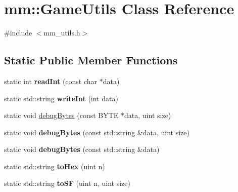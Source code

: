 \hypertarget{classmm_1_1_game_utils}{}\section{mm\+:\+:Game\+Utils Class Reference}
\label{classmm_1_1_game_utils}


{\ttfamily \#include $<$mm\+\_\+utils.\+h$>$}

\subsection*{Static Public Member Functions}
\begin{DoxyCompactItemize}
\item 
\hypertarget{classmm_1_1_game_utils_a4118fb069fcca220219a341ef0ebc362}{}static int {\bfseries read\+Int} (const char $\ast$data)\label{classmm_1_1_game_utils_a4118fb069fcca220219a341ef0ebc362}

\item 
\hypertarget{classmm_1_1_game_utils_a783d8570e2dda319ba673e0092d1d540}{}static std\+::string {\bfseries write\+Int} (int data)\label{classmm_1_1_game_utils_a783d8570e2dda319ba673e0092d1d540}

\item 
static void \hyperlink{classmm_1_1_game_utils_a363d6db2c1f097e8142a4360bfcb4af5}{debug\+Bytes} (const B\+Y\+T\+E $\ast$data, uint size)
\item 
\hypertarget{classmm_1_1_game_utils_afaf0e91873157d243e8aa291565210c4}{}static void {\bfseries debug\+Bytes} (const std\+::string \&data, uint size)\label{classmm_1_1_game_utils_afaf0e91873157d243e8aa291565210c4}

\item 
\hypertarget{classmm_1_1_game_utils_a20607cbde377a9a9bb2df318d8ea4fab}{}static void {\bfseries debug\+Bytes} (const std\+::string \&data)\label{classmm_1_1_game_utils_a20607cbde377a9a9bb2df318d8ea4fab}

\item 
\hypertarget{classmm_1_1_game_utils_a9228b9b83fc986a616b55f7d20a76c42}{}static std\+::string {\bfseries to\+Hex} (uint n)\label{classmm_1_1_game_utils_a9228b9b83fc986a616b55f7d20a76c42}

\item 
\hypertarget{classmm_1_1_game_utils_a13d6a30776f7632a8a87469936493871}{}static std\+::string {\bfseries to\+S\+F} (uint n, uint size)\label{classmm_1_1_game_utils_a13d6a30776f7632a8a87469936493871}


\end{DoxyCompactItemize}
